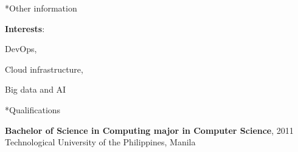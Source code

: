 \documentclass[10pt, a4paper, final]{article}
\begin{document}
\begin{section}*{Other information}
  \begin{inparadesc}
    \item \textbf{Interests}:
    \item DevOps,
    \item Cloud infrastructure,
    \item Big data and AI
  \end{inparadesc}
  \vspace{1em}
  \begin{subsection}*{Qualifications}
    \begin{compactitem}
      \vspace{0.25em}
      \item \textbf{Bachelor of Science in Computing major in Computer Science}, \textsc{2011}\\
      Technological University of the Philippines, Manila
      \vspace{0.25em}
      

\end{compactitem}
\end{subsection}
\end{section}
\end{document}
